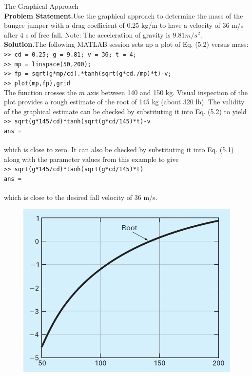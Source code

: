 \documentclass[../main.tex]{subfiles}
\begin{document}
\begin{example} The Graphical Approach\\

    \noindent\textbf{Problem Statement.}\quad Use the graphical approach to determine the mass of the bungee
    jumper with a drag coefficient of 0.25 kg/m to have a velocity of 36 m/s after 4 s of free
    fall. Note: The acceleration of gravity is $9.81 m/s^2$.\\

    \noindent\textbf{Solution.}\quad The following MATLAB session sets up a plot of Eq. (5.2) versus mass:\\

    \texttt{>> cd = 0.25; g = 9.81; v = 36; t = 4;\\
    \indent >> mp = linspace(50,200);\\
    \indent >> fp = sqrt(g*mp/cd).*tanh(sqrt(g*cd./mp)*t)-v;\\
    \indent >> plot(mp,fp),grid}\\

    The function crosses the $m$ axis between 140 and 150 kg. Visual inspection of the plot
    provides a rough estimate of the root of 145 kg (about 320 lb). The validity of the graphical
    estimate can be checked by substituting it into Eq. (5.2) to yield\\

    \texttt{>> sqrt(g*145/cd)*tanh(sqrt(g*cd/145)*t)-v\\
    \indent ans =\\
    \indent{}}\\

    \noindent which is close to zero. It can also be checked by substituting it into Eq. (5.1) along with the
    parameter values from this example to give\\

    \texttt{>> sqrt(g*145/cd)*tanh(sqrt(g*cd/145)*t)\\
    \indent ans =\\
    \indent{}}\\

    \noindent which is close to the desired fall velocity of 36 m/s.

    \begin{figure}[h]
        \includegraphics[width=0.7\linewidth]{./images/fig_5_0}
    \end{figure}
\end{example}
\end{document}

